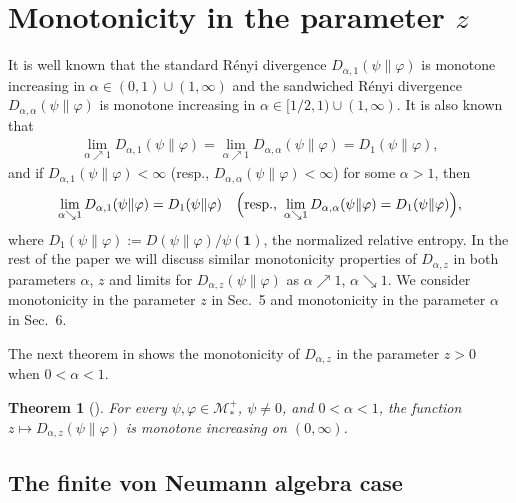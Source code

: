 \documentclass[12pt]{article}
\newtheorem{theorem}{Theorem}[section]
\theoremstyle{definition}
\theoremstyle{remark}
\numberwithin{equation}{section}
\def\cM{\mathcal M}
\def\ffi{\varphi}
\def\1{\mathbf{1}}
\begin{document}
\section{Monotonicity in the parameter $z$}

It is well known \cite{berta2018renyi,hiai2018quantum,jencova2018renyi} that the standard R\'enyi divergence
$D_{\alpha,1}(\psi\|\ffi)$ is monotone increasing in $\alpha\in(0,1)\cup(1,\infty)$ and the sandwiched R\'enyi
divergence $D_{\alpha,\alpha}(\psi\|\ffi)$ is monotone increasing in $\alpha\in[1/2,1)\cup(1,\infty)$. It is also
known \cite{berta2018renyi,hiai2018quantum,jencova2018renyi} that
\begin{align}\label{F-5.1}
\lim_{\alpha\nearrow1}D_{\alpha,1}(\psi\|\ffi)=\lim_{\alpha\nearrow1}D_{\alpha,\alpha}(\psi\|\ffi)
=D_1(\psi\|\ffi),
\end{align}
and if $D_{\alpha,1}(\psi\|\ffi)<\infty$ (resp., $D_{\alpha,\alpha}(\psi\|\ffi)<\infty$) for some $\alpha>1$, then
\begin{align}\label{F-5.2}
\lim_{\alpha\searrow1}D_{\alpha,1}(\psi\|\ffi)=D_1(\psi\|\ffi)\quad
\Bigl(\mbox{resp.,}\ \lim_{\alpha\searrow1}D_{\alpha,\alpha}(\psi\|\ffi)=D_1(\psi\|\ffi)\Bigr),
\end{align}
where $D_1(\psi\|\ffi):=D(\psi\|\ffi)/\psi(\1)$, the normalized relative entropy.
In the rest of the paper we will discuss similar monotonicity properties {of $D_{\alpha,z}$ in
both parameters $\alpha$, $z$ and limits for $D_{\alpha,z}(\psi\|\ffi)$ as
$\alpha\nearrow1$, $\alpha\searrow1$.} We consider monotonicity in the parameter $z$ in {\color{red}Sec.~5}
and monotonicity in the parameter $\alpha$ in {\color{red}Sec.~6.}

The next theorem in \cite{kato2023onrenyi} shows the monotonicity of $D_{\alpha,z}$ in the
parameter $z>0$ when $0<\alpha<1$.

\begin{theorem}[\mbox{\cite[Theorem 1(x)]{kato2023onrenyi}}]\label{T-5.1}
For every $\psi,\ffi\in\cM_*^+$, $\psi\ne0$, and $0<\alpha<1$, the function
$z\mapsto D_{\alpha,z}(\psi\|\ffi)$ is monotone increasing on $(0,\infty)$.
\end{theorem}

\subsection{The finite von Neumann algebra case}
\end{document}
